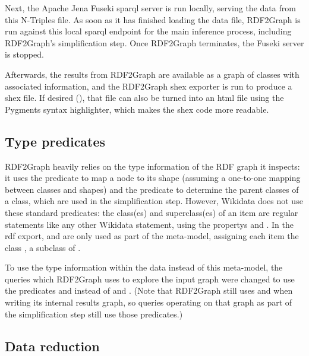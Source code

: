Next, the Apache Jena Fuseki \gls{sparql} server is run locally,
serving the data from this \gls{N-Triples} file.
As soon as it has finished loading the data file,
\gls{RDF2Graph} is run against this local \gls{sparql} endpoint for the main inference process,
including \gls{RDF2Graph}’s simplification step.
Once \gls{RDF2Graph} terminates, the Fuseki server is stopped.

Afterwards, the results from \gls{RDF2Graph} are available as a graph of classes with associated information,
and the \gls{RDF2Graph} \gls{shex} exporter is run to produce a \gls{shex} file.
If desired (),
that file can also be turned into an \gls{html} file using the Pygments syntax highlighter,
which makes the \gls{shex} code more readable.

\subsection{Type predicates}
\label{subsec:RDF2Graph+Wikidata:Wikidata:predicates}

\Gls{RDF2Graph} heavily relies on the type information of the RDF graph it inspects:
it uses the  \gls{predicate} to map a node to its \gls{shape}
(assuming a one-to-one mapping between classes and \glspl{shape})
and the  \gls{predicate} to determine the parent classes of a class,
which are used in the simplification step.
However, \gls{Wikidata} does not use these standard \glspl{predicate}:
the class(es) and superclass(es) of an item
are regular \glspl{statement} like any other \gls{Wikidata} \gls{statement},
using the \glspl{property}  and .
In the \gls{rdf} export,  and  are only used
as part of the meta-model,
assigning each item the class , a subclass of .

To use the type information within the data instead of this meta-model,
the queries which \gls{RDF2Graph} uses to explore the input graph
were changed to use the \glspl{predicate}  and 
instead of  and .
(Note that \gls{RDF2Graph} still uses  and 
when writing its internal results graph,
so queries operating on that graph as part of the simplification step
still use those \glspl{predicate}.)

\subsection{Data reduction}
\label{subsec:RDF2Graph+Wikidata:Wikidata:reduction}

